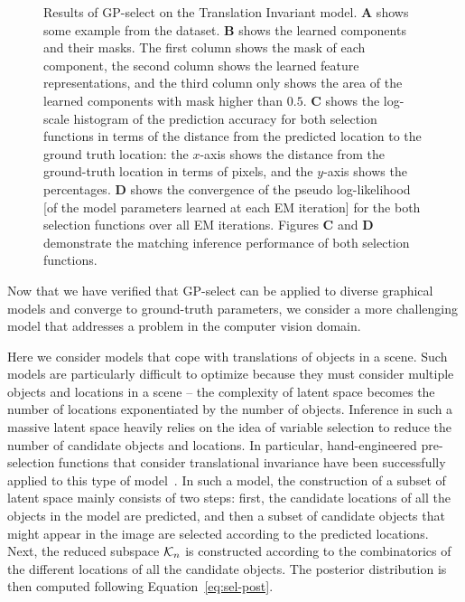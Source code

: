 \begin{figure}[t]

\caption{Results of GP-select on the Translation Invariant model.
\textbf{A} shows some example from the dataset.
\textbf{B} shows the learned components and their masks. The first column shows the mask of each component, the second column shows the learned feature representations, and the third column only shows the area of the learned components with mask higher than $0.5$.
\textbf{C} shows the log-scale histogram of the prediction accuracy for both selection functions in terms of the distance from the predicted location to the ground truth location: the $x$-axis shows the distance from the ground-truth location in terms of pixels, and the $y$-axis shows the percentages.
\textbf{D} shows the convergence of the pseudo log-likelihood [of the model parameters learned at each EM iteration] for the both selection functions over all EM iterations. Figures \textbf{C} and \textbf{D} demonstrate the matching inference performance of both selection functions. %
}
\label{fig:inveca}
\end{figure}

Now that we have verified that GP-select can be applied to diverse graphical models and converge to ground-truth parameters, we consider a more challenging model that addresses a problem in the computer vision domain.

Here we consider models that cope with translations of objects in a scene.
Such models are particularly difficult to optimize because they must consider multiple objects and locations in a scene -- the complexity of latent space becomes the number of locations exponentiated by the number of objects.
Inference in such a massive latent space heavily relies on the idea of variable selection to reduce the number of candidate objects and locations. In particular, hand-engineered pre-selection functions that consider translational invariance have been successfully applied to this type of model~\citep{DaiLucke2012b,DaiLucke2014,DaiEtAl2013}.
%
In such a model, the construction of a subset of latent space mainly consists of two steps: first, the candidate locations of all the objects in the model are predicted, and then a subset of candidate objects that might appear in the image are selected according to the predicted locations.  Next, the reduced subspace $\mathcal{K}_{n}$ is constructed according to the combinatorics of the different locations of all the candidate objects.
The posterior distribution is then computed following Equation~\eqref{eq:sel-post}.

